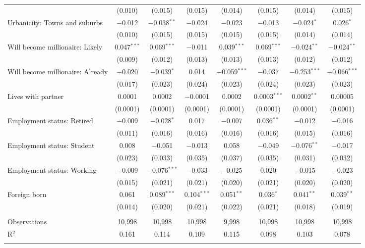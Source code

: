 \begin{tabular}{@{\extracolsep{5pt}}lccccccc}
  & (0.010) & (0.015) & (0.015) & (0.014) & (0.015) & (0.014) & (0.015) \\ 
  Urbanicity: Towns and suburbs & $-$0.012 & $-$0.038$^{**}$ & $-$0.024 & $-$0.023 & $-$0.013 & $-$0.024$^{*}$ & 0.026$^{*}$ \\ 
  & (0.010) & (0.015) & (0.015) & (0.015) & (0.015) & (0.014) & (0.014) \\ 
  Will become millionaire: Likely & 0.047$^{***}$ & 0.069$^{***}$ & $-$0.011 & 0.039$^{***}$ & 0.069$^{***}$ & $-$0.024$^{**}$ & $-$0.024$^{**}$ \\ 
  & (0.009) & (0.012) & (0.013) & (0.013) & (0.013) & (0.012) & (0.012) \\ 
  Will become millionaire: Already & $-$0.020 & $-$0.039$^{*}$ & 0.014 & $-$0.059$^{***}$ & $-$0.037 & $-$0.253$^{***}$ & $-$0.066$^{***}$ \\ 
  & (0.017) & (0.023) & (0.024) & (0.023) & (0.024) & (0.023) & (0.023) \\ 
  Lives with partner & 0.0001 & 0.0002 & $-$0.0001 & 0.0002 & 0.0003$^{***}$ & 0.0002$^{**}$ & 0.00005 \\ 
  & (0.0001) & (0.0001) & (0.0001) & (0.0001) & (0.0001) & (0.0001) & (0.0001) \\ 
  Employment status: Retired & $-$0.009 & $-$0.028$^{*}$ & 0.017 & $-$0.007 & 0.036$^{**}$ & $-$0.012 & $-$0.016 \\ 
  & (0.011) & (0.016) & (0.016) & (0.016) & (0.016) & (0.015) & (0.016) \\ 
  Employment status: Student & 0.008 & $-$0.051 & $-$0.013 & 0.058 & $-$0.049 & $-$0.076$^{**}$ & $-$0.017 \\ 
  & (0.023) & (0.033) & (0.035) & (0.037) & (0.035) & (0.031) & (0.032) \\ 
  Employment status: Working & $-$0.009 & $-$0.076$^{***}$ & $-$0.033 & $-$0.025 & 0.020 & $-$0.015 & $-$0.023 \\ 
  & (0.015) & (0.021) & (0.021) & (0.020) & (0.021) & (0.020) & (0.020) \\ 
  Foreign born & 0.061 & 0.089$^{***}$ & 0.104$^{***}$ & 0.051$^{**}$ & 0.036$^{*}$ & 0.041$^{**}$ & 0.039$^{**}$ \\ 
  & (0.014) & (0.020) & (0.021) & (0.022) & (0.021) & (0.018) & (0.019) \\ 
 \hline \\[-1.8ex] 

Observations & 10,998 & 10,998 & 10,998 & 9,998 & 10,998 & 10,998 & 10,998 \\ 
R$^{2}$ & 0.161 & 0.114 & 0.109 & 0.115 & 0.098 & 0.103 & 0.078 \\ 
\hline 
\hline \\[-1.8ex] 
\end{tabular} 